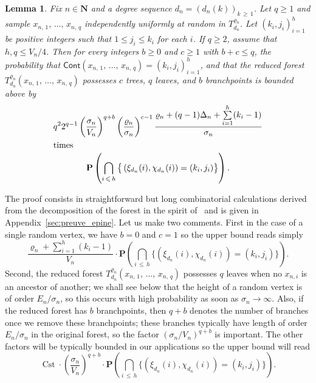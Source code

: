 \documentclass[10pt]{amsart}
\newtheorem{lemm}[theo]{Lemma}\newtheorem{prop}[theo]{Proposition}\newtheorem{coro}[theo]{Corollary}\newtheorem{conj}[theo]{Conjecture}
\theoremstyle{definition}\newtheorem{defi}[theo]{Definition}\newtheorem{rema}[theo]{Remark}\newtheorem{exam}[theo]{Example}\newtheorem{exem}[theo]{Example}\newtheorem{nota}[theo]{Notation}
\newcommand{\ensembles}[1]{\mathbf{#1}}
\newcommand{\N}{\ensembles{N}}
\renewcommand{\P}{\ensembles{P}}
\renewcommand{\Pr}[1]{\P\left(#1\right)}
\newcommand{\1}{\ensembles{1}}
\renewcommand{\le}{\leqslant}
\renewcommand{\ge}{\geqslant}
\newcommand{\Cont}{\mathsf{Cont}}
\DeclareMathOperator{\Cst}{Cst}
\newcommand{\fn}{T_{d_n}^{\varrho_n}}
\newcommand{\edges}{E}
\newcommand{\vertices}{V}
\providecommand{\?}{}
\begin{document}
\begin{lemm}\label{lem:multi_epines_sans_remise}
Fix $n \in \N$ and a degree sequence $d_n = (d_n(k))_{k\,\ge\,1}$. Let $q \ge 1$ and sample $x_{n,\,1},\,\dots,\, x_{n,\,q}$ independently uniformly at random in $\fn$. Let $(k_i, j_i)_{i=1}^h$ be positive integers such that $1 \le j_i \le k_i$ for each $i$. If $q \ge 2$, assume that $h, q \le \vertices_n/4$. Then for every integers $b \ge 0$ and $c \ge 1$ with $b+c \le q$, the probability that $\Cont(x_{n,\,1},\,\dots,\,x_{n,\,q}) = (k_i, j_i)_{i=1}^h$, and that the reduced forest ${T}_{d_n}^{\varrho_n}(x_{n,\,1},\,\dots,\,x_{n,\,q})$ possesses $c$ trees, $q$ leaves, and $b$ branchpoints is bounded above by
\begin{gather*}
q^2 2^{q - 1} \left(\frac{\sigma_n}{\vertices_n}\right)^{q + b} \left(\frac{\varrho_n}{\sigma_n}\right)^{c-1} \frac{\varrho_n + (q-1) \Delta_n + \sum\limits_{i=1}^h (k_i - 1)}{\sigma_n}
\\
\intertext{times}
\P\left(\bigcap_{i\,\le\,h} \big\{\left(\xi_{d_n}(i), \chi_{d_n}(i)\right) = (k_i, j_i)\big\}\right).
\end{gather*}
\end{lemm}

The proof consists in straightforward but long combinatorial calculations derived from the decomposition of the forest in the spirit of~\cite{BM14} and is given in Appendix~\ref{sec:preuve_epine}. Let us make two comments. First in the case of a single random vertex, we have $b=0$ and $c=1$ so the upper bound reads simply
\begin{equation}\label{eq:epine_un_sommet}
\frac{\varrho_n + \sum\limits_{i=1}^h (k_i - 1)}{\vertices_n}
\cdot \Pr{\bigcap_{i\,\le\,h} \big\{\left(\xi_{d_n}(i), \chi_{d_n}(i)\right) = \left(k_i, j_i\right)\big\}}.
\end{equation}
Second, the reduced forest ${T}_{d_n}^{\varrho_n}(x_{n,\,1},\,\dots,\,x_{n,\,q})$ possesses $q$ leaves when no $x_{n,i}$ is an ancestor of another; we shall see below that the height of a random vertex is of order $\edges_n / \sigma_n$, so this occurs with high probability as soon as $\sigma_n \to \infty$. Also, if the reduced forest has $b$ branchpoints, then $q+b$ denotes the number of branches once we remove these branchpoints; these branches typically have length of order $\edges_n/\sigma_n$ in the original forest, so the factor $(\sigma_n/\vertices_n)^{q+b}$ is important. The other factors will be typically bounded in our applications so the upper bound will read
\[
\Cst \cdot \left(\frac{\sigma_n}{\vertices_n}\right)^{q + b} \cdot \Pr{\bigcap_{i\,\le\,h} \big\{\left(\xi_{d_n}(i), \chi_{d_n}(i)\right) = \left(k_i, j_i\right)\big\}}.
\]
\end{document}
